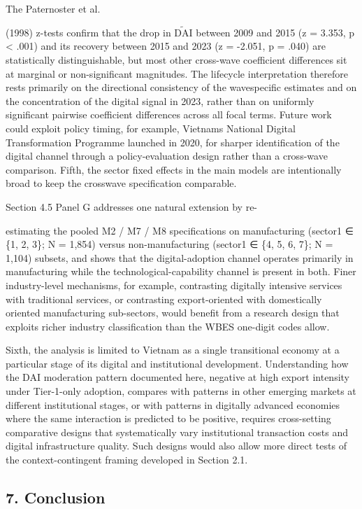 \documentclass[12pt,a4paper]{article}
\begin{document}
The Paternoster et al.

(1998) z-tests confirm that the drop in \(\tilde{\mathrm{DAI}}\) between
2009 and 2015 (z = 3.353, p \textless{} .001) and its recovery between
2015 and 2023 (z = -2.051, p = .040) are statistically distinguishable,
but most other cross-wave coefficient differences sit at marginal or
non-significant magnitudes. The lifecycle interpretation therefore rests
primarily on the directional consistency of the wavespecific estimates
and on the concentration of the digital signal in 2023, rather than on
uniformly significant pairwise coefficient differences across all focal
terms. Future work could exploit policy timing, for example,
Vietnam\textquotesingle s National Digital Transformation Programme
launched in 2020, for sharper identification of the digital channel
through a policy-evaluation design rather than a cross-wave comparison.
Fifth, the sector fixed effects in the main models are intentionally
broad to keep the crosswave specification comparable.

Section 4.5 Panel G addresses one natural extension by re-

estimating the pooled M2 / M7 / M8 specifications on manufacturing
(sector1 ∈ \{1, 2, 3\}; N = 1,854) versus non-manufacturing (sector1 ∈
\{4, 5, 6, 7\}; N = 1,104) subsets, and shows that the digital-adoption
channel operates primarily in manufacturing while the
technological-capability channel is present in both. Finer
industry-level mechanisms, for example, contrasting digitally intensive
services with traditional services, or contrasting export-oriented with
domestically oriented manufacturing sub-sectors, would benefit from a
research design that exploits richer industry classification than the
WBES one-digit codes allow.

Sixth, the analysis is limited to Vietnam as a single transitional
economy at a particular stage of its digital and institutional
development. Understanding how the DAI moderation pattern documented
here, negative at high export intensity under Tier-1-only adoption,
compares with patterns in other emerging markets at different
institutional stages, or with patterns in digitally advanced economies
where the same interaction is predicted to be positive, requires
cross-setting comparative designs that systematically vary institutional
transaction costs and digital infrastructure quality. Such designs would
also allow more direct tests of the context-contingent framing developed
in Section 2.1.

\hypertarget{7-conclusion}{%
\subsection{7. Conclusion}\label{7-conclusion}}
\end{document}

